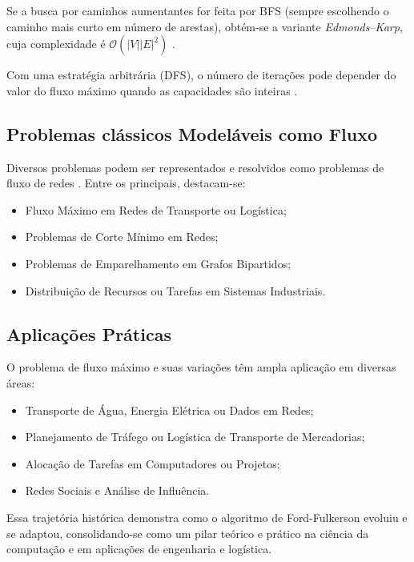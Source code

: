 \documentclass[12pt]{article}
\begin{document}
\noindent Se a busca por caminhos aumentantes for feita por BFS (sempre escolhendo o caminho mais curto em número de arestas), obtém-se a variante \emph{Edmonds–Karp}, cuja complexidade é $\mathcal{O}(|V||E|^2)$ \cite{edmonds1972,ahuja1993}. 

Com uma estratégia arbitrária (DFS), o número de iterações pode depender do valor do fluxo máximo quando as capacidades são inteiras \cite{ford1956,tarjan1983}.

\subsection{Problemas clássicos Modeláveis como Fluxo} 

Diversos problemas podem ser representados e resolvidos como problemas de fluxo de redes \cite{ahuja1993, cormen2009}. Entre os principais, destacam-se: 

\begin{itemize} 
\item Fluxo Máximo em Redes de Transporte ou Logística;
\item Problemas de Corte Mínimo em Redes;  
\item Problemas de Emparelhamento em Grafos Bipartidos;  
\item Distribuição de Recursos ou Tarefas em Sistemas Industriais.
\end{itemize}

\subsection{Aplicações Práticas}

O problema de fluxo máximo e suas variações têm ampla aplicação em diversas áreas:

\begin{itemize}
    \item Transporte de Água, Energia Elétrica ou Dados em Redes;
    \item Planejamento de Tráfego ou Logística de Transporte de Mercadorias;
    \item Alocação de Tarefas em Computadores ou Projetos;
    \item Redes Sociais e Análise de Influência.
\end{itemize}

Essa trajetória histórica demonstra como o algoritmo de Ford-Fulkerson evoluiu e se adaptou, consolidando-se como um pilar teórico e prático na ciência da computação e em aplicações de engenharia e logística.
\end{document}
